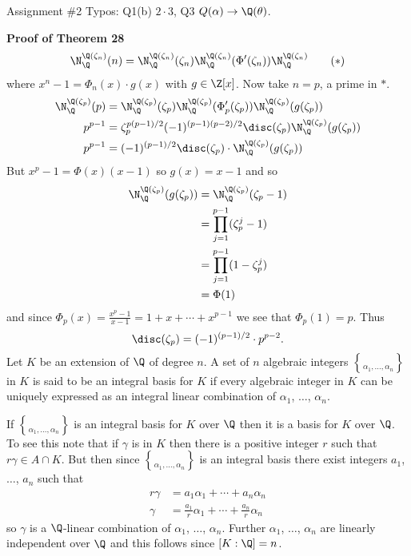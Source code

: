 Assignment \#2 Typos: Q1(b) $2\cdot3$, Q3 $Q(\alpha)\to\Q(\theta)$.

\textbf{Proof of Theorem 28}
\[ \N_\Q^{\Q(\zeta_n)}(n) = \N_\Q^{\Q(\zeta_n)}(\zeta_n)\N_\Q^{\Q(\zeta_n)}(\Phi'(\zeta_n))\N_\Q^{\Q(\zeta_n)} \tag{$*$} \]
where $x^n-1=\Phi_n(x)\cdot g(x)$ with $g\in\Z[x]$.  Now take $n=p$, a prime in $*$.
\begin{align*}
\N_\Q^{\Q(\zeta_p)}(p) &= \N_\Q^{\Q(\zeta_p)}(\zeta_p)\N_\Q^{\Q(\zeta_p)}(\Phi'_p(\zeta_p))\N_\Q^{\Q(\zeta_p)}(g(\zeta_p)) \\
p^{p-1} &= \zeta_p^{p(p-1)/2}(-1)^{(p-1)(p-2)/2}\disc(\zeta_p)\N_\Q^{\Q(\zeta_p)}(g(\zeta_p)) \\
p^{p-1} &= (-1)^{(p-1)/2}\disc(\zeta_p)\cdot\N_\Q^{\Q(\zeta_p)}(g(\zeta_p))
\end{align*}
But $x^p-1=\Phi(x)(x-1)$ so $g(x)=x-1$ and so
\begin{align*}
\N_\Q^{\Q(\zeta_p)}(g(\zeta_p)) &= \N_\Q^{\Q(\zeta_p)}(\zeta_p-1) \\
&= \prod_{j=1}^{p-1}(\zeta_p^j-1) \\
&= \prod_{j=1}^{p-1}(1-\zeta_p^j) \\
&= \Phi(1)
\end{align*}
and since $\Phi_p(x)=\frac{x^p-1}{x-1}=1+x+\dotsb+x^{p-1}$ we see that $\Phi_p(1)=p$.  Thus
\[ \disc(\zeta_p) = (-1)^{(p-1)/2}\cdot p^{p-2} . \]
 Let $K$ be an extension of $\Q$ of degree $n$.  A set of $n$ algebraic integers $\brace{\alpha_1,\dotsc,\alpha_n}$ in $K$ is said to be an integral basis for $K$ if every algebraic integer in $K$ can be uniquely expressed as an integral linear combination of $\alpha_1$, $\dotsc$, $\alpha_n$.

\remarks If $\brace{\alpha_1,\dotsc,\alpha_n}$ is an integral basis for $K$ over $\Q$ then it is a basis for $K$ over $\Q$.  To see this note that if $\gamma$ is in $K$ then there is a positive integer $r$ such that $r\gamma\in A\cap K$.  But then since $\brace{\alpha_1,\dotsc,\alpha_n}$ is an integral basis there exist integers $a_1$, $\dotsc$, $a_n$ such that
\begin{align*}
r\gamma &= a_1\alpha_1 + \dotsb + a_n\alpha_n \\
\gamma &= \frac{a_1}{r}\alpha_1 + \dotsb + \frac{a_n}{r}\alpha_n
\end{align*}
so $\gamma$ is a $\Q$-linear combination of $\alpha_1$, $\dotsc$, $\alpha_n$.  Further $\alpha_1$, $\dotsc$, $\alpha_n$ are linearly independent over $\Q$ and this follows since $[K:\Q]=n$.

